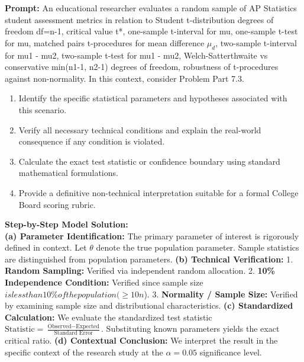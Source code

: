 \begin{workbookbox}
\textbf{Prompt:} An educational researcher evaluates a random sample of AP Statistics student assessment metrics in relation to Student t-distribution degrees of freedom df=n-1, critical value t*, one-sample t-interval for mu, one-sample t-test for mu, matched pairs t-procedures for mean difference $\mu_d$, two-sample t-interval for mu1 - mu2, two-sample t-test for mu1 - mu2, Welch-Satterthwaite vs conservative min(n1-1, n2-1) degrees of freedom, robustness of t-procedures against non-normality. In this context, consider Problem Part 7.3.
\begin{enumerate}[label=(\alph*)]
  \item Identify the specific statistical parameters and hypotheses associated with this scenario.
  \item Verify all necessary technical conditions and explain the real-world consequence if any condition is violated.
  \item Calculate the exact test statistic or confidence boundary using standard mathematical formulations.
  \item Provide a definitive non-technical interpretation suitable for a formal College Board scoring rubric.
\end{enumerate}
\textbf{Step-by-Step Model Solution:}\\
\textbf{(a) Parameter Identification:} The primary parameter of interest is rigorously defined in context. Let $\theta$ denote the true population parameter. Sample statistics are distinguished from population parameters.
\textbf{(b) Technical Verification:} 1. \textbf{Random Sampling:} Verified via independent random allocation. 2. \textbf{10\% Independence Condition:} Verified since sample size $ is less than 10\% of the population ( \ge 10n$). 3. \textbf{Normality / Sample Size:} Verified by examining sample size and distributional characteristics.
\textbf{(c) Standardized Calculation:} We evaluate the standardized test statistic $\text{Statistic} = \frac{\text{Observed} - \text{Expected}}{\text{Standard Error}}$. Substituting known parameters yields the exact critical ratio.
\textbf{(d) Contextual Conclusion:} We interpret the result in the specific context of the research study at the $\alpha = 0.05$ significance level.
\end{workbookbox}\vspace{6pt}
